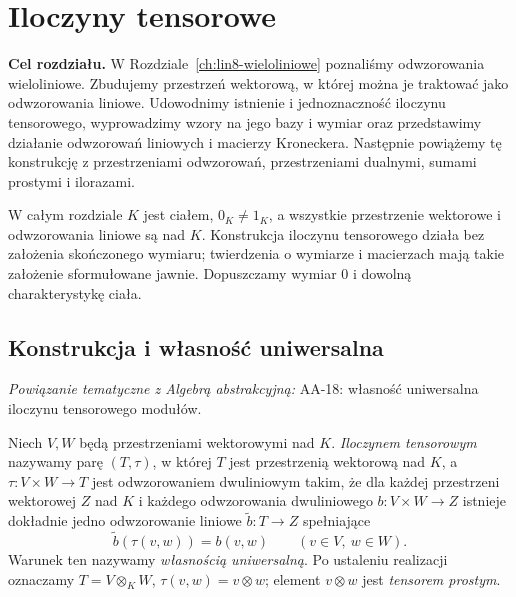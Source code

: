 \chapter{Iloczyny tensorowe}
\label{ch:lin10-iloczyny-tensorowe}

\providecommand{\atlasref}[2]{#2}


\noindent\textbf{Cel rozdziału.}
W Rozdziale~\ref{ch:lin8-wieloliniowe} poznaliśmy
odwzorowania wieloliniowe. Zbudujemy przestrzeń
wektorową, w której można je traktować jako
odwzorowania liniowe. Udowodnimy istnienie
i jednoznaczność iloczynu tensorowego,
wyprowadzimy wzory na jego bazy i wymiar
oraz przedstawimy działanie odwzorowań
liniowych i macierzy Kroneckera.
Następnie powiążemy tę konstrukcję
z przestrzeniami odwzorowań, przestrzeniami dualnymi,
sumami prostymi i ilorazami.

W całym rozdziale \(K\) jest ciałem,
\(0_K\ne1_K\), a wszystkie przestrzenie
wektorowe i odwzorowania liniowe są nad \(K\).
Konstrukcja iloczynu tensorowego działa
bez założenia skończonego wymiaru;
twierdzenia o wymiarze i macierzach
mają takie założenie sformułowane jawnie.
Dopuszczamy wymiar \(0\) i dowolną
charakterystykę ciała.

\section{Konstrukcja i własność uniwersalna}
\label{sec:lin10-konstrukcja}

\noindent\emph{Powiązanie tematyczne z Algebrą abstrakcyjną:} \atlasref{AA-18::aa:tw:tensor-universal}{AA-18: własność uniwersalna iloczynu tensorowego modułów}.


\begin{definicja}
\label{def:lin10-tensorowy}
Niech \(V,W\) będą przestrzeniami
wektorowymi nad \(K\).
\emph{Iloczynem tensorowym} nazywamy
parę \((T,\tau)\), w której \(T\) jest
przestrzenią wektorową nad \(K\),
a \(\tau\colon V\times W\to T\) jest
odwzorowaniem dwuliniowym takim, że
dla każdej przestrzeni wektorowej \(Z\)
nad \(K\) i każdego odwzorowania
dwuliniowego \(b\colon V\times W\to Z\)
istnieje dokładnie jedno odwzorowanie
liniowe \(\widetilde b\colon T\to Z\)
spełniające
\[
 \widetilde b(\tau(v,w))=b(v,w)
 \qquad(v\in V,\ w\in W).
\]
Warunek ten nazywamy
\emph{własnością uniwersalną}.
Po ustaleniu realizacji
oznaczamy \(T=V\otimes_KW\),
\(\tau(v,w)=v\otimes w\);
element \(v\otimes w\) jest
\emph{tensorem prostym}.
\end{definicja}

